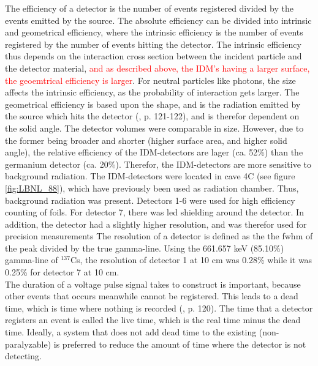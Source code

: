 \noindent 
The efficiency of a detector is the number of events registered divided by the events emitted by the source. The absolute efficiency can be divided into intrinsic and geometrical efficiency, where the intrinsic efficiency is the number of events registered by the number of events hitting the detector. The intrinsic efficiency thus depends on the interaction cross section between the incident particle and the detector material, \textcolor{red}{and as described above, the IDM's having a larger surface, the geoemtrical efficiency is larger}. For neutral particles like photons, the size affects the intrinsic efficiency, as the probability of interaction gets larger. The geometrical efficiency is based upon the shape, and is the radiation emitted by the source which hits the detector (\cite{Leo1994}, p. 121-122), and is therefor dependent on the solid angle. The detector volumes were comparable in size. However, due to the former being broader and shorter (higher surface area, and higher solid angle), the relative efficiency of the IDM-detectors are lager (ca. 52\%) than the germanium detector (ca. 20\%). Therefor, the IDM-detectors are more sensitive to background radiation. The IDM-detectors were located in cave 4C (see figure \ref{fig:LBNL_88}), which have previously been used as radiation chamber. Thus, background radiation was present. Detectors 1-6 were used for high efficiency counting of foils. For detector 7, there was led shielding around the detector. In addition, the detector had a slightly higher resolution, and was therefor used for precision measurements%
The resolution of a detector is defined as the the fwhm of the peak divided by the true gamma-line. Using the 661.657 keV (85.10\%) gamma-line of $^{137}$Cs, the resolution of detector 1 at 10 cm was 0.28\% while it was 0.25\% for detector 7 at 10 cm. \\ %

The duration of a voltage pulse signal takes to construct is important, because other events that occurs meanwhile cannot be registered. This leads to a dead time, which is time where nothing is recorded (\cite{Leo1994}, p. 120). The time that a detector registers an event is called the live time, which is the real time minus the dead time. Ideally, a system that does not add dead time to the existing (non-paralyzable) is preferred to reduce the amount of time where the detector is not detecting. 


